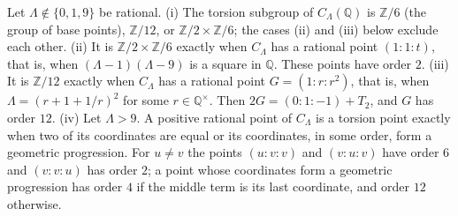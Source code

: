 \documentclass[10pt]{article}
\newcommand{\Q}{\mathbb{Q}}
\newcommand{\Z}{\mathbb{Z}}
\begin{document}
\begin{theorem}[Torsion]\label{thm:torsion}
Let $\Lambda\notin\{0,1,9\}$ be rational.
\textup{(i)} The torsion subgroup of $C_\Lambda(\Q)$ is $\Z/6$ (the group of base points), $\Z/12$, or $\Z/2\times\Z/6$; the cases \textup{(ii)} and \textup{(iii)} below exclude each other.
\textup{(ii)} It is $\Z/2\times\Z/6$ exactly when $C_\Lambda$ has a rational point $(1:1:t)$, that is, when $(\Lambda-1)(\Lambda-9)$ is a square in $\Q$. These points have order $2$.
\textup{(iii)} It is $\Z/12$ exactly when $C_\Lambda$ has a rational point $G=(1:r:r^2)$, that is, when $\Lambda=(r+1+1/r)^2$ for some $r\in\Q^\times$. Then $2G=(0:1:-1)+T_2$, and $G$ has order $12$.
\textup{(iv)} Let $\Lambda>9$. A positive rational point of $C_\Lambda$ is a torsion point exactly when two of its coordinates are equal or its coordinates, in some order, form a geometric progression. For $u\ne v$ the points $(u:v:v)$ and $(v:u:v)$ have order $6$ and $(v:v:u)$ has order $2$; a point whose coordinates form a geometric progression has order $4$ if the middle term is its last coordinate, and order $12$ otherwise.
\end{theorem}
\end{document}
